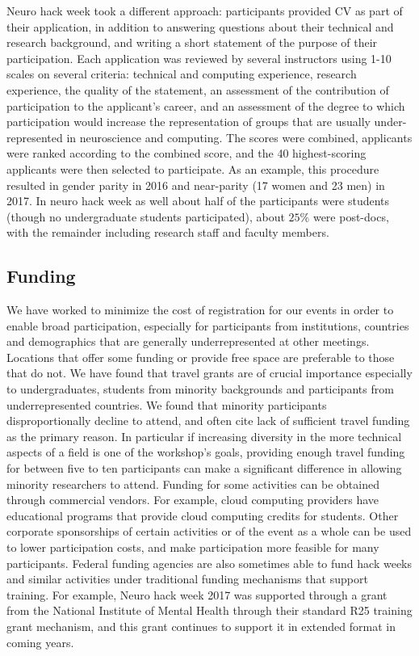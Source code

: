 \documentclass{aastex62}
\begin{document}
Neuro hack week took a different approach: participants provided CV as part of their application, in addition to answering questions about their technical and research background, and writing a short statement of the purpose of their participation. Each application was reviewed by several instructors using 1-10 scales on several criteria: technical and computing experience, research experience, the quality of the statement, an assessment of the contribution of participation to the applicant's career, and an assessment of the degree to which participation would increase the representation of groups that are usually under-represented in neuroscience and computing. The scores were combined, applicants were ranked according to the combined score, and the 40 highest-scoring applicants were then selected to participate. As an example,  this procedure resulted in gender parity in 2016 and near-parity (17 women and 23 men) in 2017. In neuro hack week as well about half of the participants were students (though no undergraduate students participated), about $25\%$ were post-docs, with the remainder including research staff and faculty members.

\subsection{Funding}

We have worked to minimize the cost of registration for our events in order to enable broad participation, especially for participants from institutions, countries and demographics that are generally underrepresented at other meetings. Locations that offer some funding or provide free space are preferable to those that do not.
We have found that travel grants are of crucial importance especially to undergraduates, students from minority backgrounds and participants from underrepresented countries. We found that minority participants disproportionally decline to attend, and often cite lack of sufficient travel funding as the primary reason. In particular if increasing diversity in the more technical aspects of a field is one of the workshop's goals, providing enough travel funding for between five to ten participants can make a significant difference in allowing minority researchers to attend.
Funding for some activities can be obtained through commercial vendors.
For example, cloud computing providers have educational programs that provide cloud computing credits for students.
Other corporate sponsorships of certain activities or of the event as a whole can be used to lower participation costs, and make participation more feasible for many participants.
Federal funding agencies are also sometimes able to fund hack weeks and similar activities under traditional funding mechanisms that support training. For example, Neuro hack week 2017 was supported through a grant from the National Institute of Mental Health through their standard R25 training grant mechanism, and this grant continues to support it in extended format in coming years.
\end{document}

